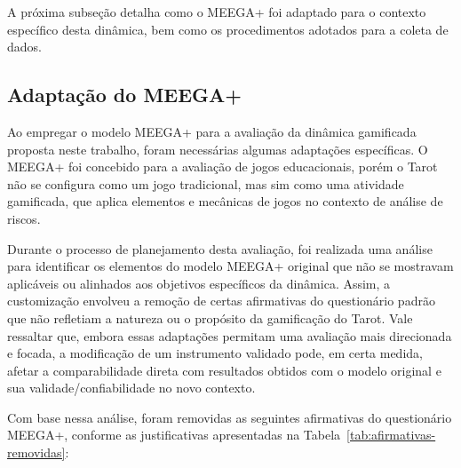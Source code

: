 \documentclass[
	12pt,
	openright,
	twoside,
	a4paper,
	english,
	brazil
	]{abntex2}
\begin{document}
A próxima subseção detalha como o MEEGA+ foi adaptado para o contexto específico desta dinâmica, bem como os procedimentos adotados para a coleta de dados.

\subsection{Adaptação do MEEGA+}

Ao empregar o modelo MEEGA+ para a avaliação da dinâmica gamificada proposta neste trabalho, foram necessárias algumas adaptações específicas. O MEEGA+ foi concebido para a avaliação de jogos educacionais, porém o Tarot não se configura como um jogo tradicional, mas sim como uma atividade gamificada, que aplica elementos e mecânicas de jogos no contexto de análise de riscos.

Durante o processo de planejamento desta avaliação, foi realizada uma análise para identificar os elementos do modelo MEEGA+ original que não se mostravam aplicáveis ou alinhados aos objetivos específicos da dinâmica. Assim, a customização envolveu a remoção de certas afirmativas do questionário padrão que não refletiam a natureza ou o propósito da gamificação do Tarot. Vale ressaltar que, embora essas adaptações permitam uma avaliação mais direcionada e focada, a modificação de um instrumento validado pode, em certa medida, afetar a comparabilidade direta com resultados obtidos com o modelo original e sua validade/confiabilidade no novo contexto.

Com base nessa análise, foram removidas as seguintes afirmativas do questionário MEEGA+, conforme as justificativas apresentadas na Tabela~\ref{tab:afirmativas-removidas}:
\end{document}
